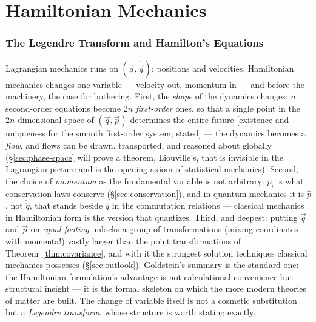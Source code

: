 \documentclass[11pt]{article}
\theoremstyle{plain}
\theoremstyle{definition}
\theoremstyle{remark}
\newcommand{\vq}{\vec{q}}
\newcommand{\vp}{\vec{p}}
\begin{document}
\clearpage
\part{Hamiltonian Mechanics}

\section{The Legendre Transform and Hamilton's Equations}
\label{sec:hamilton}

Lagrangian mechanics runs on $(\vq, \dot\vq)$: positions and velocities.
Hamiltonian mechanics changes one variable --- velocity out, momentum in
--- and before the machinery, the case for bothering. First, the
\emph{shape} of the dynamics changes: $n$ second-order equations become
$2n$ \emph{first-order} ones, so that a single point in the
$2n$-dimensional space of $(\vq,\vp)$ determines the entire future
[existence and uniqueness for the smooth first-order system; stated]
--- the
dynamics becomes a \emph{flow}, and flows can be drawn, transported, and
reasoned about globally (\S\ref{sec:phase-space} will prove a theorem,
Liouville's, that is invisible in the Lagrangian picture and is the
opening axiom of statistical mechanics). Second, the choice of
\emph{momentum} as the fundamental variable is not arbitrary: $p_i$
is what conservation laws conserve (\S\ref{sec:conservation}), and in
quantum mechanics it is $\hat p$, not $\dot{\hat q}$, that stands beside
$\hat q$ in the commutation relations --- classical mechanics in
Hamiltonian form is the version that quantizes. Third, and deepest:
putting $\vq$ and $\vp$ on \emph{equal footing} unlocks a group of
transformations (mixing coordinates with momenta!) vastly larger than the
point transformations of Theorem~\ref{thm:covariance}, and with it the
strongest solution techniques classical mechanics possesses
(\S\ref{sec:outlook}). Goldstein's summary is the standard one: the
Hamiltonian formulation's advantage is not calculational convenience but
structural insight --- it is the formal skeleton on which the more modern
theories of matter are built. The change of variable itself is not a
cosmetic substitution but a \emph{Legendre transform}, whose structure is
worth stating exactly.
\end{document}
